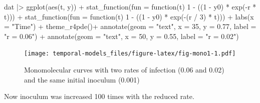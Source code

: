 \documentclass[
  letterpaper,
]{book}
\newenvironment{Shaded}{\begin{snugshade}}{\end{snugshade}}
\newcommand{\AttributeTok}[1]{\textcolor[rgb]{0.40,0.45,0.13}{#1}}
\newcommand{\ControlFlowTok}[1]{\textcolor[rgb]{0.00,0.23,0.31}{#1}}
\newcommand{\DecValTok}[1]{\textcolor[rgb]{0.68,0.00,0.00}{#1}}
\newcommand{\FloatTok}[1]{\textcolor[rgb]{0.68,0.00,0.00}{#1}}
\newcommand{\FunctionTok}[1]{\textcolor[rgb]{0.28,0.35,0.67}{#1}}
\newcommand{\NormalTok}[1]{\textcolor[rgb]{0.00,0.23,0.31}{#1}}
\newcommand{\SpecialCharTok}[1]{\textcolor[rgb]{0.37,0.37,0.37}{#1}}
\newcommand{\StringTok}[1]{\textcolor[rgb]{0.13,0.47,0.30}{#1}}
\begin{document}
\begin{Shaded}
\begin{Highlighting}[]
\NormalTok{dat }\SpecialCharTok{|\textgreater{}}
  \FunctionTok{ggplot}\NormalTok{(}\FunctionTok{aes}\NormalTok{(t, y)) }\SpecialCharTok{+}
  \FunctionTok{stat\_function}\NormalTok{(}\AttributeTok{fun =} \ControlFlowTok{function}\NormalTok{(t) }\DecValTok{1} \SpecialCharTok{{-}}\NormalTok{ ((}\DecValTok{1} \SpecialCharTok{{-}}\NormalTok{ y0) }\SpecialCharTok{*} \FunctionTok{exp}\NormalTok{(}\SpecialCharTok{{-}}\NormalTok{r }\SpecialCharTok{*}\NormalTok{ t))) }\SpecialCharTok{+}
  \FunctionTok{stat\_function}\NormalTok{(}\AttributeTok{fun =} \ControlFlowTok{function}\NormalTok{(t) }\DecValTok{1} \SpecialCharTok{{-}}\NormalTok{ ((}\DecValTok{1} \SpecialCharTok{{-}}\NormalTok{ y0) }\SpecialCharTok{*} \FunctionTok{exp}\NormalTok{(}\SpecialCharTok{{-}}\NormalTok{(r }\SpecialCharTok{/} \DecValTok{3}\NormalTok{) }\SpecialCharTok{*}\NormalTok{ t))) }\SpecialCharTok{+}
  \FunctionTok{labs}\NormalTok{(}\AttributeTok{x =} \StringTok{"Time"}\NormalTok{) }\SpecialCharTok{+}
 \FunctionTok{theme\_r4pde}\NormalTok{()}\SpecialCharTok{+}
  \FunctionTok{annotate}\NormalTok{(}\AttributeTok{geom =} \StringTok{"text"}\NormalTok{, }\AttributeTok{x =} \DecValTok{35}\NormalTok{, }\AttributeTok{y =} \FloatTok{0.77}\NormalTok{, }\AttributeTok{label =} \StringTok{"r = 0.06"}\NormalTok{) }\SpecialCharTok{+}
  \FunctionTok{annotate}\NormalTok{(}\AttributeTok{geom =} \StringTok{"text"}\NormalTok{, }\AttributeTok{x =} \DecValTok{50}\NormalTok{, }\AttributeTok{y =} \FloatTok{0.55}\NormalTok{, }\AttributeTok{label =} \StringTok{"r = 0.02"}\NormalTok{)}
\end{Highlighting}
\end{Shaded}

\begin{figure}

{\centering \texttt{[image: temporal-models\_files/figure-latex/fig-mono1-1.pdf]}

}

\caption{\label{fig-mono1}Monomolecular curves with two rates of
infection (0.06 and 0.02) and the same initial inoculum (0.001)}

\end{figure}

Now inoculum was increased 100 times with the reduced rate.
\end{document}
